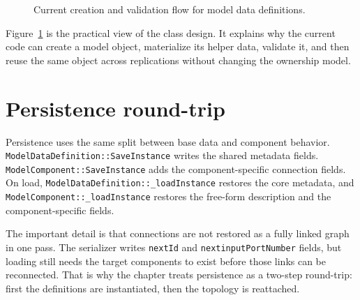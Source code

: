\begin{figure}[htbp]
\centering
\caption{Current creation and validation flow for model data definitions.}
\label{fig:model-component-creation-flow}
\end{figure}

Figure~\ref{fig:model-component-creation-flow} is the practical view of the
class design. It explains why the current code can create a model object,
materialize its helper data, validate it, and then reuse the same object across
replications without changing the ownership model.

\section{Persistence round-trip}
\label{sec:model-component-persistence}

Persistence uses the same split between base data and component behavior.
\texttt{ModelDataDefinition::SaveInstance} writes the shared metadata fields.
\texttt{ModelComponent::SaveInstance} adds the component-specific connection
fields. On load, \texttt{ModelDataDefinition::\_loadInstance} restores the core
metadata, and \texttt{ModelComponent::\_loadInstance} restores the free-form
description and the component-specific fields.

The important detail is that connections are not restored as a fully linked
graph in one pass. The serializer writes \texttt{nextId} and \texttt{nextinputPortNumber}
fields, but loading still needs the target components to exist before those
links can be reconnected. That is why the chapter treats persistence as a
two-step round-trip: first the definitions are instantiated, then the topology
is reattached.

